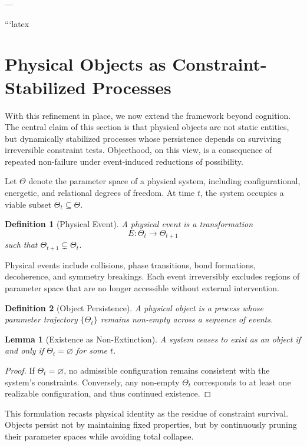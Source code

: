 \documentclass[11pt]{article}
\newtheorem{definition}{Definition}
\newtheorem{lemma}{Lemma}
\theoremstyle{remark}
\begin{document}
---

```latex
\section{Physical Objects as Constraint-Stabilized Processes}

With this refinement in place, we now extend the framework beyond cognition. The central claim of this section is that physical objects are not static entities, but dynamically stabilized processes whose persistence depends on surviving irreversible constraint tests. Objecthood, on this view, is a consequence of repeated non-failure under event-induced reductions of possibility.

Let $\Theta$ denote the parameter space of a physical system, including configurational, energetic, and relational degrees of freedom. At time $t$, the system occupies a viable subset $\Theta_t \subseteq \Theta$.

\begin{definition}[Physical Event]
A physical event is a transformation
\[
E : \Theta_t \rightarrow \Theta_{t+1}
\]
such that $\Theta_{t+1} \subsetneq \Theta_t$.
\end{definition}

Physical events include collisions, phase transitions, bond formations, decoherence, and symmetry breakings. Each event irreversibly excludes regions of parameter space that are no longer accessible without external intervention.

\begin{definition}[Object Persistence]
A physical object is a process whose parameter trajectory $\{\Theta_t\}$ remains non-empty across a sequence of events.
\end{definition}

\begin{lemma}[Existence as Non-Extinction]
A system ceases to exist as an object if and only if $\Theta_t = \varnothing$ for some $t$.
\end{lemma}

\begin{proof}
If $\Theta_t = \varnothing$, no admissible configuration remains consistent with the system’s constraints. Conversely, any non-empty $\Theta_t$ corresponds to at least one realizable configuration, and thus continued existence.
\end{proof}

This formulation recasts physical identity as the residue of constraint survival. Objects persist not by maintaining fixed properties, but by continuously pruning their parameter spaces while avoiding total collapse.
\end{document}
